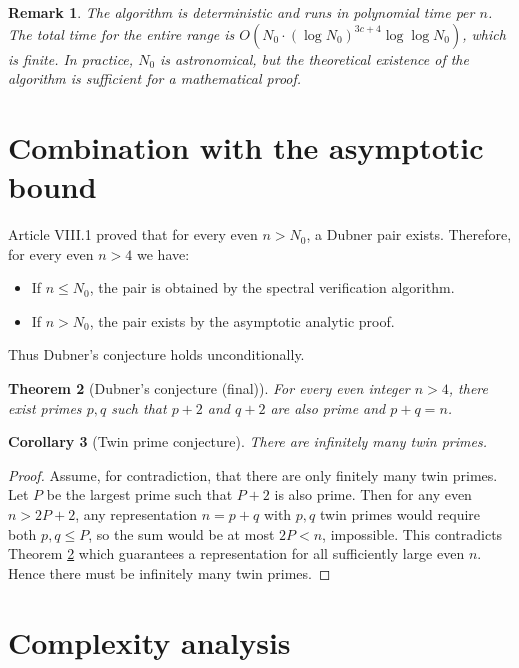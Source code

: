 \documentclass[11pt,a4paper]{article}
\newtheorem{theorem}{Theorem}[section]
\newtheorem{corollary}[theorem]{Corollary}
\newtheorem{remark}[theorem]{Remark}
\begin{document}
\begin{remark}
The algorithm is deterministic and runs in polynomial time per \(n\). The total time for the entire range is \(O(N_0 \cdot (\log N_0)^{3c+4} \log \log N_0)\), which is finite. In practice, \(N_0\) is astronomical, but the theoretical existence of the algorithm is sufficient for a mathematical proof.
\end{remark}

\section{Combination with the asymptotic bound}

Article VIII.1 proved that for every even \(n > N_0\), a Dubner pair exists. Therefore, for every even \(n > 4\) we have:
\begin{itemize}
\item If \(n \le N_0\), the pair is obtained by the spectral verification algorithm.
\item If \(n > N_0\), the pair exists by the asymptotic analytic proof.
\end{itemize}
Thus Dubner's conjecture holds unconditionally.

\begin{theorem}[Dubner's conjecture (final)]\label{thm:dubner}
For every even integer \(n > 4\), there exist primes \(p,q\) such that \(p+2\) and \(q+2\) are also prime and \(p+q = n\).
\end{theorem}

\begin{corollary}[Twin prime conjecture]\label{cor:twin}
There are infinitely many twin primes.
\end{corollary}
\begin{proof}
Assume, for contradiction, that there are only finitely many twin primes. Let \(P\) be the largest prime such that \(P+2\) is also prime. Then for any even \(n > 2P+2\), any representation \(n = p+q\) with \(p,q\) twin primes would require both \(p,q \le P\), so the sum would be at most \(2P < n\), impossible. This contradicts Theorem \ref{thm:dubner} which guarantees a representation for all sufficiently large even \(n\). Hence there must be infinitely many twin primes.
\end{proof}

\section{Complexity analysis}
\end{document}
